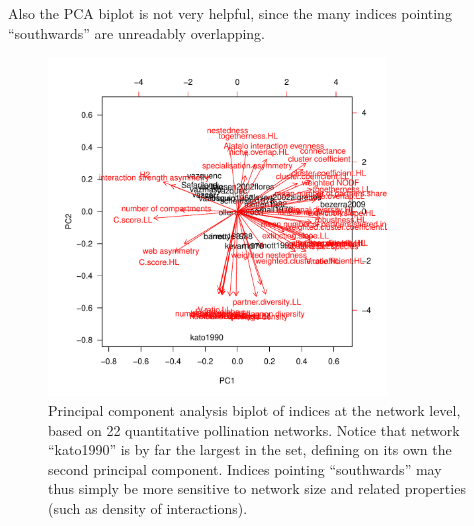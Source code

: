 \documentclass[a4paper, 11pt]{article}
\begin{document}
Also the PCA biplot is not very helpful, since the many indices pointing ``southwards'' are unreadably overlapping.
%
\begin{figure}
\centering
\includegraphics[width=0.8\textwidth]{figures/PCAnetworklevel}
\caption{Principal component analysis biplot of indices at the network level, based on 22 quantitative pollination networks. Notice that network ``kato1990'' is by far the largest in the set, defining on its own the second principal component. Indices pointing ``southwards'' may thus simply be more sensitive to network size and related properties (such as density of interactions).}
\label{fig:PCAnetworklevel}
\end{figure}
\end{document}
